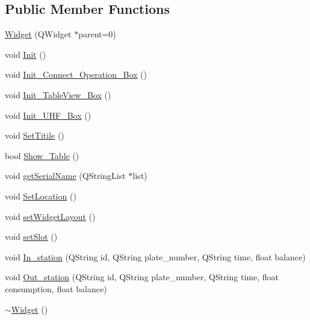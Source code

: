 \subsection*{Public Member Functions}
\begin{DoxyCompactItemize}
\item 
\mbox{\hyperlink{class_widget_a29531c7f141e461322981b3b579d4590}{Widget}} (Q\+Widget $\ast$parent=0)
\item 
void \mbox{\hyperlink{class_widget_a3d48db3265c90f9dfa3e2303971690bf}{Init}} ()
\item 
void \mbox{\hyperlink{class_widget_a73ede9961382ea942361e9845fa11aa0}{Init\+\_\+\+Connect\+\_\+\+Operation\+\_\+\+Box}} ()
\item 
void \mbox{\hyperlink{class_widget_a2fb10278c840ae57af473502a583ab20}{Init\+\_\+\+Table\+View\+\_\+\+Box}} ()
\item 
void \mbox{\hyperlink{class_widget_a0565863c4d5f710fa6b503767027959b}{Init\+\_\+\+U\+H\+F\+\_\+\+Box}} ()
\item 
void \mbox{\hyperlink{class_widget_a8499caa320e65f51b4ccf7d77ff82176}{Set\+Titile}} ()
\item 
bool \mbox{\hyperlink{class_widget_a426f2aea1215a9b0120eb56e986ce1e9}{Show\+\_\+\+Table}} ()
\item 
void \mbox{\hyperlink{class_widget_afb97de9294ffdbb2c64ed1f96aea9261}{get\+Serial\+Name}} (Q\+String\+List $\ast$list)
\item 
void \mbox{\hyperlink{class_widget_a2f0684dd82782945ee9dc918d9ac30a5}{Set\+Location}} ()
\item 
void \mbox{\hyperlink{class_widget_a1b530946ccda60d3b1bd124360d93c4f}{set\+Widget\+Layout}} ()
\item 
void \mbox{\hyperlink{class_widget_ac60c5a62bc3197fbc7ade8f40df70c70}{set\+Slot}} ()
\item 
void \mbox{\hyperlink{class_widget_a9288c149d01aec945f48b6f064f3c7dd}{In\+\_\+station}} (Q\+String id, Q\+String plate\+\_\+number, Q\+String time, float balance)
\item 
void \mbox{\hyperlink{class_widget_a28a22d7c79dd5af8dbe573ace468d61e}{Out\+\_\+station}} (Q\+String id, Q\+String plate\+\_\+number, Q\+String time, float consumption, float balance)
\item 
\mbox{\hyperlink{class_widget_aa24f66bcbaaec6d458b0980e8c8eae65}{$\sim$\+Widget}} ()
\end{DoxyCompactItemize}
